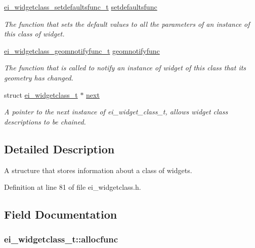 \begin{DoxyCompactItemize}
\hyperlink{ei__widgetclass_8h_aa04d729c9dca14d3ac92c0f9aa8cc5cb}{ei\+\_\+widgetclass\+\_\+setdefaultsfunc\+\_\+t} \hyperlink{structei__widgetclass__t_a5fec706eefca10172d897cf61b268510}{setdefaultsfunc}
\begin{DoxyCompactList}\small\item\em The function that sets the default values to all the parameters of an instance of this class of widget. \end{DoxyCompactList}\item 
\hyperlink{ei__widgetclass_8h_a751dc2e4c264c3597fcc2d59878f6265}{ei\+\_\+widgetclass\+\_\+geomnotifyfunc\+\_\+t} \hyperlink{structei__widgetclass__t_aaf0aa3f54a48a6b3f8b8e12574ede4b7}{geomnotifyfunc}
\begin{DoxyCompactList}\small\item\em The function that is called to notify an instance of widget of this class that its geometry has changed. \end{DoxyCompactList}\item 
struct \hyperlink{structei__widgetclass__t}{ei\+\_\+widgetclass\+\_\+t} $\ast$ \hyperlink{structei__widgetclass__t_aa184e650475ec2451f033858db1876f0}{next}
\begin{DoxyCompactList}\small\item\em A pointer to the next instance of ei\+\_\+widget\+\_\+class\+\_\+t, allows widget class descriptions to be chained. \end{DoxyCompactList}\end{DoxyCompactItemize}


\subsection{Detailed Description}
A structure that stores information about a class of widgets. 

Definition at line 81 of file ei\+\_\+widgetclass.\+h.



\subsection{Field Documentation}
\hypertarget{structei__widgetclass__t_a233446250cdde4347c1381427923d21a}{
\subsubsection[{allocfunc}]{ ei\+\_\+widgetclass\+\_\+t\+::allocfunc}}\label{structei__widgetclass__t_a233446250cdde4347c1381427923d21a}


